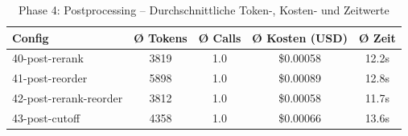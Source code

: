 \begin{table}[H]
\centering
\small
\begin{tabular}{lcccc}
\toprule
Config & Ø Tokens & Ø Calls & Ø Kosten (USD) & Ø Zeit \\
\midrule
40-post-rerank & 3819 & 1.0 & \$0.00058 & 12.2s \\
41-post-reorder & 5898 & 1.0 & \$0.00089 & 12.8s \\
42-post-rerank-reorder & 3812 & 1.0 & \$0.00058 & 11.7s \\
43-post-cutoff & 4358 & 1.0 & \$0.00066 & 13.6s \\
\bottomrule
\end{tabular}
\caption{Phase 4: Postprocessing -- Durchschnittliche Token-, Kosten- und Zeitwerte}
\label{tab:phase4_cost}
\end{table}